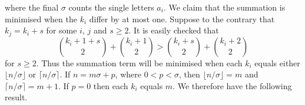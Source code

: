 \documentclass[11pt]{amsart}
\newcommand{\1}{\bar{1}}
\theoremstyle{plain}
\theoremstyle{definition}
\theoremstyle{remark}
\begin{document}
where the final $\sigma$ counts the single letters $a_i$.
We claim that the summation is minimised when the $k_i$  differ by at most one.
Suppose to the contrary that $k_j=k_i+s$ for some $i$, $j$
and $s \ge 2$.  It is easily checked that
$${k_i+1+s \choose 2} + {k_i+1 \choose 2} > {k_i+s \choose 2} + {k_i+2 \choose 2}$$
for $s \ge 2$. 
Thus the summation term will be minimised when each $k_i$ equals either
$\lfloor n/\sigma \rfloor$ or $\lceil n/\sigma \rceil$.
If $n=m\sigma +p$, where $0 < p <\sigma$, then $\lfloor n/\sigma \rfloor=m$ and
$\lceil n/\sigma \rceil= m+1$.
If $p=0$ then each $k_i$ equals $m$.  We therefore have the following result.
\end{document}
